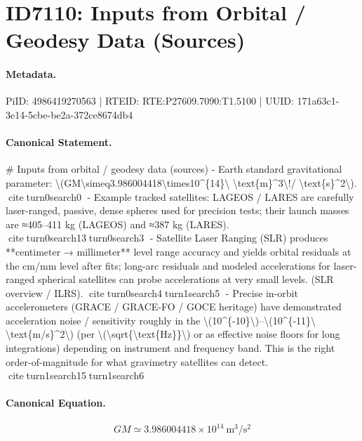 \section*{ID7110: Inputs from Orbital / Geodesy Data (Sources)}
\paragraph{Metadata.}
PiID: 4986419270563 | RTEID: RTE:P27609.7090:T1.5100 | UUID: 171a63c1-3e14-5cbe-be2a-372ce8674db4

\paragraph{Canonical Statement.}
\# Inputs from orbital / geodesy data (sources) - Earth standard gravitational parameter: \textbackslash{}(GM\textbackslash{}simeq3.986004418\textbackslash{}times10\textasciicircum{}\{14\}\textbackslash{} \textbackslash{}text\{m\}\textasciicircum{}3\textbackslash{}!/ \textbackslash{}text\{s\}\textasciicircum{}2\textbackslash{}). citeturn0search0 - Example tracked satellites: LAGEOS / LARES are carefully laser-ranged, passive, dense spheres used for precision tests; their launch masses are ≈405–411 kg (LAGEOS) and ≈387 kg (LARES). citeturn0search13turn0search3 - Satellite Laser Ranging (SLR) produces **centimeter → millimeter** level range accuracy and yields orbital residuals at the cm/mm level after fits; long-arc residuals and modeled accelerations for laser-ranged spherical satellites can probe accelerations at very small levels. (SLR overview / ILRS). citeturn0search4turn1search5 - Precise in-orbit accelerometers (GRACE / GRACE-FO / GOCE heritage) have demonstrated acceleration noise / sensitivity roughly in the \textbackslash{}(10\textasciicircum{}\{-10\}\textbackslash{})–\textbackslash{}(10\textasciicircum{}\{-11\}\textbackslash{} \textbackslash{}text\{m/s\}\textasciicircum{}2\textbackslash{}) (per \textbackslash{}(\textbackslash{}sqrt\{\textbackslash{}text\{Hz\}\}\textbackslash{}) or as effective noise floors for long integrations) depending on instrument and frequency band. This is the right order-of-magnitude for what gravimetry satellites can detect. citeturn1search15turn1search6

\paragraph{Canonical Equation.}
\[
GM\simeq3.986004418\times10^{14}\ \text{m}^3\!/ \text{s}^2
\]

